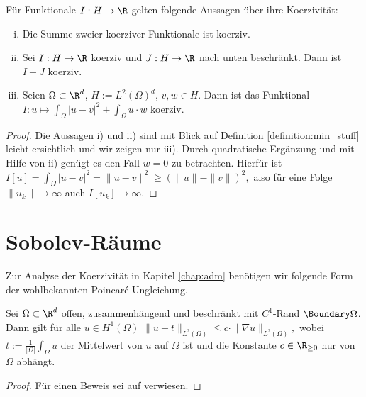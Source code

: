\documentclass{mythesis}
\begin{document}
\begin{lemma} \label{lem:coercivity}
    Für Funktionale $I: H \to \R$ gelten folgende Aussagen über ihre Koerzivität:
    \begin{enumerate}[i)]
        \item
	   Die Summe zweier koerziver Funktionale ist koerziv.
       \item
	   Sei $I: H \to \R$ koerziv und $J: H \to \R$ nach unten beschränkt.
	   Dann ist $I + J$ koerziv.
       \item
	   Seien $\Omega \subset \R^d$, $H := L^2(\Omega)^d$, $v, w \in H$.
	   Dann ist das Funktional
	   \begin{math}
	       I: u \mapsto \int_\Omega |u - v|^2 + \int_\Omega u \cdot w
	   \end{math}
	   koerziv.
    \end{enumerate}
    \begin{proof}
	Die Aussagen i) und ii) sind mit Blick auf Definition \ref{definition:min_stuff} leicht ersichtlich und wir zeigen nur iii).
	Durch quadratische Ergänzung und mit Hilfe von ii) genügt es den Fall $w = 0$ zu betrachten.
	Hierfür ist
	\begin{math}
	    I[u] = \int_\Omega |u - v|^2 = \|u - v\|^2 \ge (\|u\| - \|v\|)^2,
	\end{math}
	also für eine Folge $\|u_k\| \to \infty$ auch $I[u_k] \to \infty$.
    \end{proof}
\end{lemma}

\section*{Sobolev-Räume}

Zur Analyse der Koerzivität in Kapitel \ref{chap:adm} benötigen wir folgende Form der wohlbekannten Poincaré Ungleichung.

\begin{theorem} \label{thm:poincare-wirtinger}
    Sei $\Omega \subset \R^d$ offen, zusammenhängend und beschränkt mit $C^1$-Rand $\Boundary \Omega$.
    Dann gilt für alle $u \in H^1(\Omega)$
    \begin{math}
	\|u - t\|_{L^2(\Omega)} \le c \cdot \|\nabla u\|_{L^2(\Omega)},
    \end{math}
    wobei $t := \frac{1}{|\Omega|} \int_\Omega u$ der Mittelwert von $u$ auf $\Omega$ ist und die Konstante $c \in \R_{\ge 0}$ nur von $\Omega$ abhängt.
    \begin{proof}
        Für einen Beweis sei auf \cite[§5.8.1]{evans2010partial} verwiesen.
    \end{proof}
\end{theorem}
\end{document}
